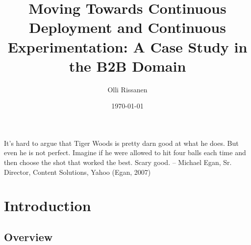 \documentclass[english]{tktltiki2}
\title{Moving Towards Continuous Deployment and Continuous Experimentation: A Case Study in the B2B Domain}
\author{Olli Rissanen}
\date{\today}
\theoremstyle{definition}
\theoremstyle{remark}
\begin{document}

\frontmatter      %

\maketitle        %
\makeabstract     %

\tableofcontents  %


\newpage

It’s hard to argue that Tiger Woods is pretty darn good at what he does. But even he is not perfect. Imagine if
he were allowed to hit four balls each time and then choose the shot that worked the best. Scary good.
-- Michael Egan, Sr. Director, Content Solutions, Yahoo (Egan, 2007)

\mainmatter       %




\section{Introduction} %

\subsection{Overview}

\end{document}
